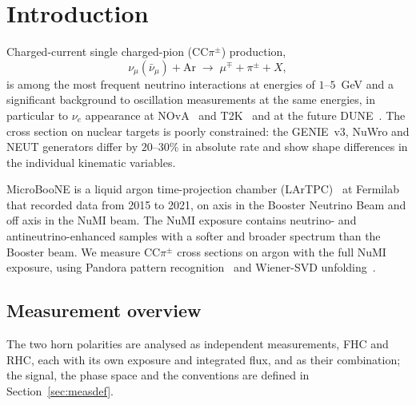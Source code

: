 \documentclass[11pt,a4paper]{article}
\newcommand{\uboone}{MicroBooNE}
\begin{document}
\begin{titlepage}
\begin{abstract}
    The extraction passes closure, ensembles of pseudo-experiments (pull widths $0.92$--$1.04$) and
    pseudo-data from reweighted interaction models (largest bias $1.2\sigma$, in one sparse bin); no
    closure test with an independent generator has been made.
  \end{abstract}
  \vfill
  \tableofcontents
\end{titlepage}


\section{Introduction}
\label{sec:intro}

Charged-current single charged-pion (CC$\pi^{\pm}$) production,
\begin{equation}
  \nu_\mu(\bar{\nu}_\mu) + \mathrm{Ar} \;\longrightarrow\;
  \mu^{\mp} + \pi^{\pm} + X,
\end{equation}
is among the most frequent neutrino interactions at energies of $1$--$5$~GeV and a significant
background to oscillation measurements at the same energies, in particular to $\nu_e$ appearance
at NOvA~\cite{nova} and T2K~\cite{t2k} and at the future DUNE~\cite{dune}. The cross section on
nuclear targets is poorly constrained: the GENIE~v3, NuWro and NEUT generators differ by
$20$--$30\%$ in absolute rate and show shape differences in the individual kinematic variables.

\uboone{} is a liquid argon time-projection chamber (LArTPC)~\cite{uboone_nim} at Fermilab that
recorded data from 2015 to 2021, on axis in the Booster Neutrino Beam and off axis in the NuMI
beam. The NuMI exposure contains neutrino- and antineutrino-enhanced samples with a softer and
broader spectrum than the Booster beam. We measure CC$\pi^{\pm}$ cross sections on argon with the
full NuMI exposure, using Pandora pattern recognition~\cite{pandora,uboone_pandora} and Wiener-SVD
unfolding~\cite{wienervsd}.

\subsection{Measurement overview}
\label{sec:status}

The two horn polarities are analysed as independent measurements, FHC and RHC, each with its own
exposure and integrated flux, and as their combination; the signal, the phase space and the conventions
are defined in Section~\ref{sec:measdef}.
\end{document}
